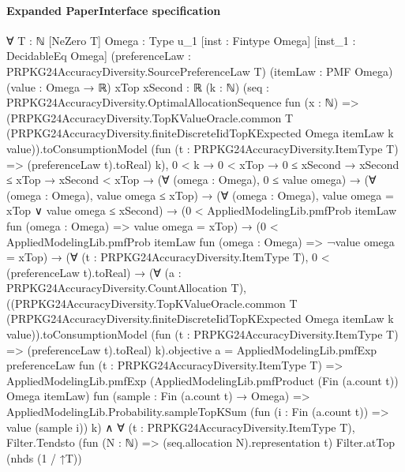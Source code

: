 \documentclass[10pt]{article}
\begin{document}
\paragraph{Expanded PaperInterface specification}
\begin{ReviewVerbatim}
∀ {T : ℕ} [NeZero T] {Omega : Type u_1} [inst : Fintype Omega] [inst_1 : DecidableEq Omega]
  (preferenceLaw : PRPKG24AccuracyDiversity.SourcePreferenceLaw T) (itemLaw : PMF Omega) (value : Omega → ℝ)
  {xTop xSecond : ℝ} (k : ℕ)
  (seq :
    PRPKG24AccuracyDiversity.OptimalAllocationSequence fun (x : ℕ) =>
      (PRPKG24AccuracyDiversity.TopKValueOracle.common T
            (PRPKG24AccuracyDiversity.finiteDiscreteIidTopKExpected Omega itemLaw k value)).toConsumptionModel
        (fun (t : PRPKG24AccuracyDiversity.ItemType T) => (preferenceLaw t).toReal) k),
  0 < k →
    0 < xTop →
      0 ≤ xSecond →
        xSecond ≤ xTop →
          xSecond < xTop →
            (∀ (omega : Omega), 0 ≤ value omega) →
              (∀ (omega : Omega), value omega ≤ xTop) →
                (∀ (omega : Omega), value omega = xTop ∨ value omega ≤ xSecond) →
                  (0 < AppliedModelingLib.pmfProb itemLaw fun (omega : Omega) => value omega = xTop) →
                    (0 < AppliedModelingLib.pmfProb itemLaw fun (omega : Omega) => ¬value omega = xTop) →
                      (∀ (t : PRPKG24AccuracyDiversity.ItemType T), 0 < (preferenceLaw t).toReal) →
                        (∀ (a : PRPKG24AccuracyDiversity.CountAllocation T),
                            ((PRPKG24AccuracyDiversity.TopKValueOracle.common T
                                        (PRPKG24AccuracyDiversity.finiteDiscreteIidTopKExpected Omega itemLaw k
                                          value)).toConsumptionModel
                                    (fun (t : PRPKG24AccuracyDiversity.ItemType T) => (preferenceLaw t).toReal)
                                    k).objective
                                a =
                              AppliedModelingLib.pmfExp preferenceLaw fun (t : PRPKG24AccuracyDiversity.ItemType T) =>
                                AppliedModelingLib.pmfExp
                                  (AppliedModelingLib.pmfProduct (Fin (a.count t)) Omega itemLaw)
                                  fun (sample : Fin (a.count t) → Omega) =>
                                  AppliedModelingLib.Probability.sampleTopKSum
                                    (fun (i : Fin (a.count t)) => value (sample i)) k) ∧
                          ∀ (t : PRPKG24AccuracyDiversity.ItemType T),
                            Filter.Tendsto (fun (N : ℕ) => (seq.allocation N).representation t) Filter.atTop
                              (nhds (1 / ↑T))
\end{ReviewVerbatim}
\end{document}
